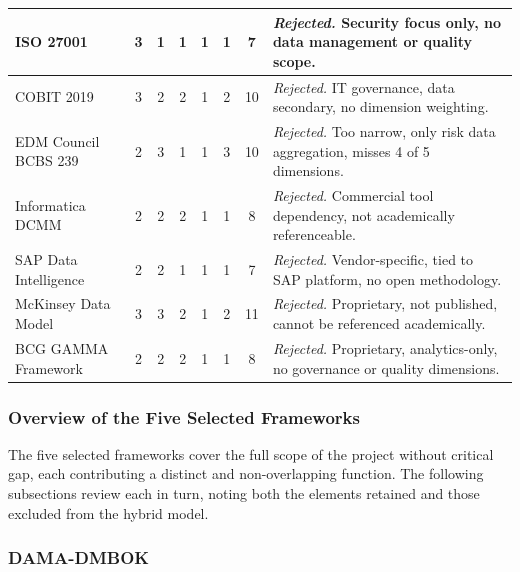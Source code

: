 \begin{center}
{\begin{longtable}{|p{2.6cm}|c|c|c|c|c|c|p{5.8cm}|}
\hline
ISO 27001       & 3 & 1 & 1 & 1 & 1 & 7 &
  \textit{Rejected.} Security focus only, no data management or quality scope. \\
\hline
COBIT 2019      & 3 & 2 & 2 & 1 & 2 & 10 &
  \textit{Rejected.} IT governance, data secondary, no dimension weighting. \\
\hline
EDM Council BCBS 239 & 2 & 3 & 1 & 1 & 3 & 10 &
  \textit{Rejected.} Too narrow, only risk data aggregation, misses 4 of 5 dimensions. \\
\hline
Informatica DCMM & 2 & 2 & 2 & 1 & 1 & 8 &
  \textit{Rejected.} Commercial tool dependency, not academically referenceable. \\
\hline
SAP Data Intelligence & 2 & 2 & 1 & 1 & 1 & 7 &
  \textit{Rejected.} Vendor-specific, tied to SAP platform, no open methodology. \\
\hline
McKinsey Data Model & 3 & 3 & 2 & 1 & 2 & 11 &
  \textit{Rejected.} Proprietary, not published, cannot be referenced academically. \\
\hline
BCG GAMMA Framework & 2 & 2 & 2 & 1 & 1 & 8 &
  \textit{Rejected.} Proprietary, analytics-only, no governance or quality dimensions. \\
\hline
\end{longtable}
}
\end{center}

\subsubsection{Overview of the Five Selected Frameworks}

The five selected frameworks cover the full scope of the project without critical gap, each contributing a distinct and non-overlapping function. The following subsections review each in turn, noting both the elements retained and those excluded from the hybrid model.

\subsubsection{DAMA-DMBOK}

